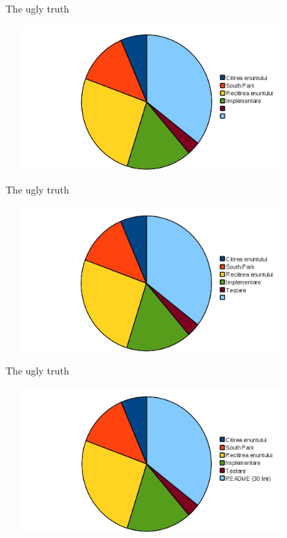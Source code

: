 \documentclass{beamer}
\begin{document}
\begin{frame}{The ugly truth}
\begin{center}
\includegraphics[height=5.5cm, width=11cm]{img/Step5.png}
\end{center}
\end{frame}

\begin{frame}{The ugly truth}
\begin{center}
\includegraphics[height=5.5cm, width=11cm]{img/Step6.png}
\end{center}
\end{frame}

\begin{frame}{The ugly truth}
\begin{center}
\includegraphics[height=5.5cm, width=11cm]{img/Step7.png}
\end{center}
\end{frame}
\end{document}
